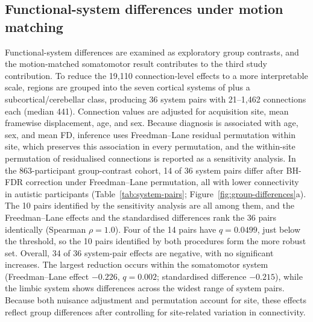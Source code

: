\subsection{Functional-system differences under motion matching}
\label{subsec:results-system-differences}

Functional-system differences are examined as exploratory group contrasts, and the motion-matched somatomotor result contributes to the third study contribution. To reduce the 19,110 connection-level effects to a more interpretable scale, regions are grouped into the seven cortical systems of \citet{Yeoetal2011} plus a subcortical/cerebellar class, producing 36 system pairs with 21--1,462 connections each (median 441). Connection values are adjusted for acquisition site, mean framewise displacement, age, and sex. Because diagnosis is associated with age, sex, and mean FD, inference uses Freedman--Lane residual permutation within site, which preserves this association in every permutation, and the within-site permutation of residualised connections is reported as a sensitivity analysis. In the 863-participant group-contrast cohort, 14 of 36 system pairs differ after BH-FDR correction under Freedman--Lane permutation, all with lower connectivity in autistic participants (Table~\ref{tab:system-pairs}; Figure~\ref{fig:group-differences}a). The 10 pairs identified by the sensitivity analysis are all among them, and the Freedman--Lane effects and the standardised differences rank the 36 pairs identically (Spearman $\rho=1.0$). Four of the 14 pairs have $q=0.0499$, just below the threshold, so the 10 pairs identified by both procedures form the more robust set. Overall, 34 of 36 system-pair effects are negative, with no significant increases. The largest reduction occurs within the somatomotor system (Freedman--Lane effect $-0.226$, $q=0.002$; standardised difference $-0.215$), while the limbic system shows differences across the widest range of system pairs. Because both nuisance adjustment and permutation account for site, these effects reflect group differences after controlling for site-related variation in connectivity.

